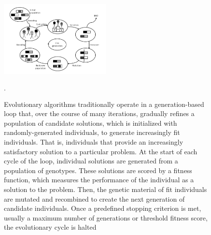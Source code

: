 \begin{figure}
\centering
\includegraphics[width=0.5\textwidth]{img/working_principle_of_EA.jpg}
\caption[]{\label{fig:working_principle} Evolutionary algorithms traditionally operate in a generation-based loop that, over the course of many iterations, gradually refines a population of candidate solutions, which is initialized with randomly-generated individuals, to generate increasingly fit individuals. That is, individuals that provide an increasingly satisfactory solution to a particular problem. At the start of each cycle of the loop, individual solutions are generated from a population of genotypes. These solutions are scored by a fitness function, which measures the performance of the individual as a solution to the problem. Then, the genetic material of fit individuals are mutated and recombined to create the next generation of candidate individuals. Once a predefined stopping criterion is met, usually a maximum number of generations or threshold fitness score, the evolutionary cycle is halted \cite{Prothmann2009EvolutionaryOptimisation}}.
\end{figure}